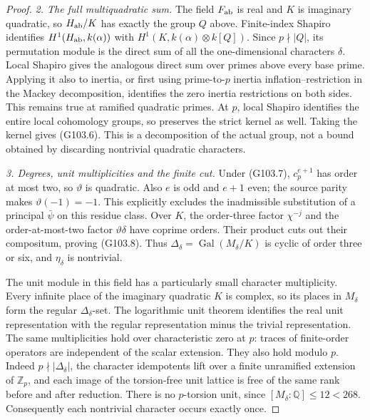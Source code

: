\begin{proof}
\emph{2. The full multiquadratic sum.}
The field $F_{\rm ab}$ is real and $K$ is imaginary quadratic,
so $H_{\rm ab}/K$ has exactly the group $Q$ above.
Finite-index Shapiro identifies
$H^1(H_{\rm ab},k(\alpha))$ with
$H^1(K,k(\alpha)\otimes k[Q])$.
Since $p\nmid|Q|$, its permutation module is the direct sum
of all the one-dimensional characters $\delta$.
Local Shapiro gives the analogous direct sum over primes above
every base prime.  Applying it also to inertia, or first using
prime-to-$p$ inertia inflation--restriction in the Mackey
decomposition, identifies the zero inertia restrictions on both
sides.  This remains true at ramified quadratic primes.
At $p$, local Shapiro identifies the entire local cohomology
groups, so preserves the strict kernel as well.
Taking the kernel gives (G103.6).
This is a decomposition of the actual group, not a bound obtained
by discarding nontrivial quadratic characters.

\emph{3. Degrees, unit multiplicities and the finite cut.}
Under (G103.7), $c_p^{e+1}$ has order at most two, so
$\vartheta$ is quadratic.  Also $e$ is odd and $e+1$ even;
the source parity makes $\vartheta(-1)=-1$.
This explicitly excludes the inadmissible substitution of a
principal $\bar\psi$ on this residue class.
Over $K$, the order-three factor $\chi^{-j}$ and the
order-at-most-two factor $\vartheta\delta$ have coprime orders.
Their product cuts out their compositum, proving (G103.8).
Thus $\Delta_\delta=\operatorname{Gal}(M_\delta/K)$ is
cyclic of order three or six, and $\eta_\delta$ is nontrivial.

The unit module in this field has a particularly small character
multiplicity.  Every infinite place of the imaginary quadratic
$K$ is complex, so its places in $M_\delta$ form the regular
$\Delta_\delta$-set.  The logarithmic unit theorem identifies
the real unit representation with the regular representation
minus the trivial representation.  The same multiplicities hold
over characteristic zero at $p$: traces of finite-order operators
are independent of the scalar extension.
They also hold modulo $p$.  Indeed $p\nmid|\Delta_\delta|$,
the character idempotents lift over a finite unramified extension
of $\mathbb Z_p$, and each image of the torsion-free unit lattice
is free of the same rank before and after reduction.
There is no $p$-torsion unit, since $[M_\delta:\mathbb Q]\le12<268$.
Consequently each nontrivial character occurs exactly once.


\end{proof}

